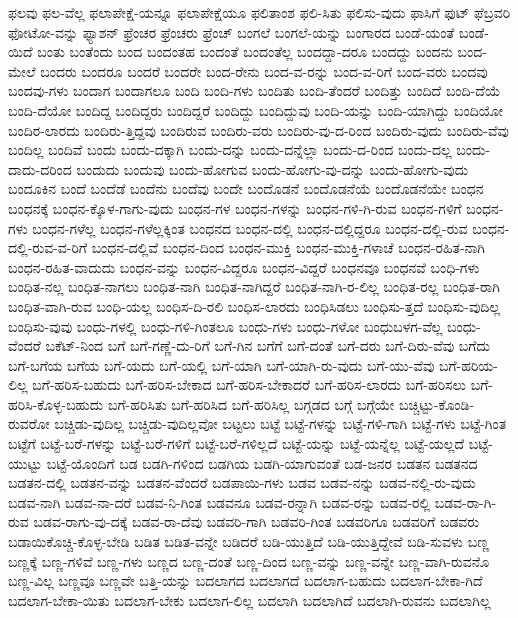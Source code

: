 {ಫಲವು
ಫಲ-ವೆಲ್ಲ
ಫಲಾಪೇಕ್ಷೆ-ಯನ್ನೂ
ಫಲಾಪೇಕ್ಷೆಯೂ
ಫಲಿತಾಂಶ
ಫಲಿ-ಸಿತು
ಫಲಿಸು-ವುದು
ಫಾಸಿಗೆ
ಫುಟ್
ಫೆಬ್ರವರಿ
ಫೋಟೋ-ವನ್ನು
ಫ್ಯಾಶನ್
ಫ್ರೆಂಚರ
ಫ್ರೆಂಚರು
ಫ್ರೆಂಚ್
ಬಂಗಲೆ
ಬಂಗಲೆ-ಯನ್ನು
ಬಂಗಾರದ
ಬಂಡೆ-ಯಂತೆ
ಬಂಡೆ-ಯಿದೆ
ಬಂತು
ಬಂತೆಂದು
ಬಂದ
ಬಂದಂತಹ
ಬಂದಂತೆ
ಬಂದಂತೆಲ್ಲ
ಬಂದದ್ದಾ-ದರೂ
ಬಂದದ್ದು
ಬಂದನು
ಬಂದ-ಮೇಲೆ
ಬಂದರು
ಬಂದರೂ
ಬಂದರೆ
ಬಂದರೇ
ಬಂದ-ರೇನು
ಬಂದ-ವ-ರನ್ನು
ಬಂದ-ವ-ರಿಗೆ
ಬಂದ-ವರು
ಬಂದವು
ಬಂದವು-ಗಳು
ಬಂದಾಗ
ಬಂದಾಗಲೂ
ಬಂದಿ
ಬಂದಿ-ಗಳು
ಬಂದಿತು
ಬಂದಿ-ತೆಂದರೆ
ಬಂದಿತ್ತು
ಬಂದಿದೆ
ಬಂದಿ-ದೆಯೆ
ಬಂದಿ-ದೆಯೋ
ಬಂದಿದ್ದ
ಬಂದಿದ್ದರು
ಬಂದಿದ್ದರೆ
ಬಂದಿದ್ದು
ಬಂದಿದ್ದುವು
ಬಂದಿ-ಯನ್ನು
ಬಂದಿ-ಯಾಗಿದ್ದು
ಬಂದಿಯೋ
ಬಂದಿರ-ಲಾರದು
ಬಂದಿರು-ತ್ತಿದ್ದವು
ಬಂದಿರುವ
ಬಂದಿರು-ವರು
ಬಂದಿರು-ವು-ದ-ರಿಂದ
ಬಂದಿರು-ವುದು
ಬಂದಿರು-ವೆವು
ಬಂದಿಲ್ಲ
ಬಂದಿವೆ
ಬಂದು
ಬಂದು-ದಕ್ಕಾಗಿ
ಬಂದು-ದನ್ನು
ಬಂದು-ದನ್ನೆಲ್ಲಾ
ಬಂದು-ದ-ರಿಂದ
ಬಂದು-ದಲ್ಲ
ಬಂದು-ದಾದು-ದರಿಂದ
ಬಂದುದು
ಬಂದುವು
ಬಂದು-ಹೋಗುವ
ಬಂದು-ಹೋಗು-ವು-ದನ್ನು
ಬಂದು-ಹೋಗು-ವುದು
ಬಂದೂಕಿನ
ಬಂದೆ
ಬಂದೆಡೆ
ಬಂದೆನು
ಬಂದೆವು
ಬಂದೇ
ಬಂದೊಡನೆ
ಬಂದೊಡನೆಯೆ
ಬಂದೊಡನೆಯೇ
ಬಂಧನ
ಬಂಧನಕ್ಕೆ
ಬಂಧನ-ಕ್ಕೊಳ-ಗಾಗು-ವುದು
ಬಂಧನ-ಗಳ
ಬಂಧನ-ಗಳನ್ನು
ಬಂಧನ-ಗಳಿ-ಗಿ-ರುವ
ಬಂಧನ-ಗಳಿಗೆ
ಬಂಧನ-ಗಳು
ಬಂಧನ-ಗಳೆಲ್ಲ
ಬಂಧನ-ಗಳೆಲ್ಲಕ್ಕಿಂತ
ಬಂಧನದ
ಬಂಧನ-ದಲ್ಲಿ
ಬಂಧನ-ದಲ್ಲಿದ್ದರೂ
ಬಂಧನ-ದಲ್ಲಿ-ರುವ
ಬಂಧನ-ದಲ್ಲಿ-ರುವ-ವ-ರಿಗೆ
ಬಂಧನ-ದಲ್ಲಿವೆ
ಬಂಧನ-ದಿಂದ
ಬಂಧನ-ಮುಕ್ತಿ
ಬಂಧನ-ಮುಕ್ತಿ-ಗಳಾಚೆ
ಬಂಧನ-ರಹಿತ-ನಾಗಿ
ಬಂಧನ-ರಹಿತ-ವಾದುದು
ಬಂಧನ-ವನ್ನು
ಬಂಧನ-ವಿದ್ದರೂ
ಬಂಧನ-ವಿದ್ದರೆ
ಬಂಧನವೂ
ಬಂಧನವೆ
ಬಂಧಿ-ಗಳು
ಬಂಧಿತ-ನಲ್ಲ
ಬಂಧಿತ-ನಾಗಲು
ಬಂಧಿತ-ನಾಗಿ
ಬಂಧಿತ-ನಾಗಿದ್ದರೆ
ಬಂಧಿತ-ನಾಗಿ-ರ-ಲಿಲ್ಲ
ಬಂಧಿತ-ರಲ್ಲ
ಬಂಧಿತ-ರಾಗಿ
ಬಂಧಿತ-ವಾಗಿ-ರುವ
ಬಂಧಿ-ಯಲ್ಲ
ಬಂಧಿಸ-ದಿ-ರಲಿ
ಬಂಧಿಸ-ಲಾರದು
ಬಂಧಿಸಿಡಲು
ಬಂಧಿಸು-ತ್ತದೆ
ಬಂಧಿಸು-ವುದಿಲ್ಲ
ಬಂಧಿಸು-ವುವು
ಬಂಧು-ಗಳಲ್ಲಿ
ಬಂಧು-ಗಳಿ-ಗಿಂತಲೂ
ಬಂಧು-ಗಳು
ಬಂಧು-ಗಳೋ
ಬಂಧುಬಳಗ-ವೆಲ್ಲ
ಬಂಧು-ವೆಂದರೆ
ಬಕೆಟ್-ನಿಂದ
ಬಗೆ
ಬಗೆ-ಗಣ್ಣೆ-ದು-ರಿಗೆ
ಬಗೆ-ಗಿನ
ಬಗೆಗೆ
ಬಗೆ-ದಂತೆ
ಬಗೆ-ದರು
ಬಗೆ-ದಿರು-ವೆವು
ಬಗೆದು
ಬಗೆ-ಬಗೆಯ
ಬಗೆಯ
ಬಗೆ-ಯದು
ಬಗೆ-ಯಲ್ಲಿ
ಬಗೆ-ಯಾಗಿ
ಬಗೆ-ಯಾಗಿ-ರು-ವುದು
ಬಗೆ-ಯು-ವೆವು
ಬಗೆ-ಹರಿಯ-ಲಿಲ್ಲ
ಬಗೆ-ಹರಿಸ-ಬಹುದು
ಬಗೆ-ಹರಿಸ-ಬೇಕಾದ
ಬಗೆ-ಹರಿಸ-ಬೇಕಾದರೆ
ಬಗೆ-ಹರಿಸ-ಲಾರದು
ಬಗೆ-ಹರಿಸಲು
ಬಗೆ-ಹರಿಸಿ-ಕೊಳ್ಳ-ಬಹುದು
ಬಗೆ-ಹರಿಸಿತು
ಬಗೆ-ಹರಿಸಿದ
ಬಗೆ-ಹರಿಸಿಲ್ಲ
ಬಗ್ಗಡದ
ಬಗ್ಗೆ
ಬಗ್ಗೆಯೇ
ಬಚ್ಚಿಟ್ಟು-ಕೊಂಡಿ-ರುವರೋ
ಬಚ್ಚಿಡು-ವುದಿಲ್ಲ
ಬಚ್ಚಿಡು-ವುದಿಲ್ಲವೋ
ಬಟ್ಟಲು
ಬಟ್ಟೆ
ಬಟ್ಟೆ-ಗಳನ್ನು
ಬಟ್ಟೆ-ಗಳಿ-ಗಾಗಿ
ಬಟ್ಟೆ-ಗಳು
ಬಟ್ಟೆ-ಗಿಂತ
ಬಟ್ಟೆಗೆ
ಬಟ್ಟೆ-ಬರೆ-ಗಳನ್ನು
ಬಟ್ಟೆ-ಬರೆ-ಗಳಿಗೆ
ಬಟ್ಟೆ-ಬರೆ-ಗಳಿಲ್ಲದೆ
ಬಟ್ಟೆ-ಯನ್ನು
ಬಟ್ಟೆ-ಯನ್ನೆಲ್ಲ
ಬಟ್ಟೆ-ಯಲ್ಲದೆ
ಬಟ್ಟೆ-ಯುಟ್ಟು
ಬಟ್ಟೆ-ಯೊಂದಿಗೆ
ಬಡ
ಬಡಗಿ-ಗಳಿಂದ
ಬಡಗಿಯ
ಬಡಗಿ-ಯಾಗುವಂತೆ
ಬಡ-ಜನರ
ಬಡತನ
ಬಡತನದ
ಬಡತನ-ದಲ್ಲಿ
ಬಡತನ-ವನ್ನು
ಬಡತನ-ವೆಂದರೆ
ಬಡಪಾಯಿ-ಗಳು
ಬಡವ
ಬಡವ-ನನ್ನು
ಬಡವ-ನಲ್ಲಿ-ರು-ವುದು
ಬಡವ-ನಾಗಿ
ಬಡವ-ನಾ-ದರೆ
ಬಡವ-ನಿ-ಗಿಂತ
ಬಡವನೂ
ಬಡವ-ರನ್ನಾಗಿ
ಬಡವ-ರನ್ನು
ಬಡವ-ರಲ್ಲಿ
ಬಡವ-ರಾ-ಗಿ-ರುವ
ಬಡವ-ರಾಗು-ವು-ದಕ್ಕೆ
ಬಡವ-ರಾ-ದೆವು
ಬಡವರಿ-ಗಾಗಿ
ಬಡವರಿ-ಗಿಂತ
ಬಡವರಿಗೂ
ಬಡವರಿಗೆ
ಬಡವರು
ಬಡಾಯಿಕೊಚ್ಚಿ-ಕೊಳ್ಳ-ಬೇಡಿ
ಬಡಿತ
ಬಡಿತ-ವನ್ನೇ
ಬಡಿದರೆ
ಬಡಿ-ಯುತ್ತಿದೆ
ಬಡಿ-ಯುತ್ತಿದ್ದೇವೆ
ಬಡಿ-ಸುವಳು
ಬಣ್ಣ
ಬಣ್ಣಕ್ಕೆ
ಬಣ್ಣ-ಗಳಿವೆ
ಬಣ್ಣ-ಗಳು
ಬಣ್ಣದ
ಬಣ್ಣ-ದಂತೆ
ಬಣ್ಣ-ದಿಂದ
ಬಣ್ಣ-ವನ್ನು
ಬಣ್ಣ-ವನ್ನೇ
ಬಣ್ಣ-ವಾಗಿ-ರುವನೊ
ಬಣ್ಣ-ವಿಲ್ಲ
ಬಣ್ಣವೂ
ಬಣ್ಣವೇ
ಬತ್ತಿ-ಯನ್ನು
ಬದಲಾಗದ
ಬದಲಾಗದೆ
ಬದಲಾಗ-ಬಹುದು
ಬದಲಾಗ-ಬೇಕಾ-ಗಿದೆ
ಬದಲಾಗ-ಬೇಕಾ-ಯಿತು
ಬದಲಾಗ-ಬೇಕು
ಬದಲಾಗ-ಲಿಲ್ಲ
ಬದಲಾಗಿ
ಬದಲಾಗಿದೆ
ಬದಲಾಗಿ-ರುವನು
ಬದಲಾಗಿಲ್ಲ
}
